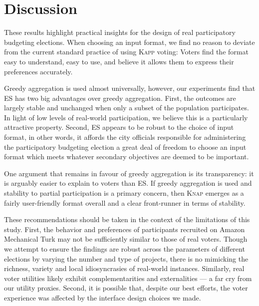\documentclass[runningheads]{llncs}
\newcommand{\knap}{\textsc{Knap}}
\newcommand{\kapp}{\textsc{Kapp}}
\newcommand{\mes}{ES}
\begin{document}
\section{Discussion}

These results highlight practical insights  for the design of real participatory budgeting elections. 
When choosing an input format, we find no reason to deviate from the current standard practice of  using \kapp{} voting: Voters find the format easy to understand, easy to  use, and believe it allows them to express their preferences accurately. 

Greedy aggregation is used almost universally,  however, our experiments find that \mes{} has  two  big advantages over greedy aggregation.  First,  the outcomes are largely stable and unchanged when only a subset of the population participates. In light of low levels of real-world participation, we believe this is a particularly attractive property. Second, \mes{} appears to be robust to the choice of input format, in other words, it affords the city officials responsible for administering the participatory budgeting election a great deal of freedom to choose an input format which meets whatever secondary objectives are deemed to be important. %

One argument that remains in favour of greedy aggregation is its transparency: it is arguably easier to explain to voters than \mes{}. If greedy aggregation is used    and stability to partial participation is a primary concern, then \knap{} emerges as a fairly user-friendly format overall and a clear front-runner in terms of stability.

These recommendations should be taken in the context of the limitations of this study. First, the  behavior and preferences of participants recruited on Amazon Mechanical Turk may not be sufficiently similar to those of real voters.  Though we attempt to  ensure the findings are robust across the parameters of different elections by varying the number and type of projects, there is no mimicking the richness, variety and local idiosyncrasies of real-world instances. Similarly, real voter utilities likely exhibit complementarities and externalities  --- a far cry from our utility proxies. Second, it is possible that, despite our best efforts, the   voter experience   was affected by the interface design choices we made. 
\end{document}
